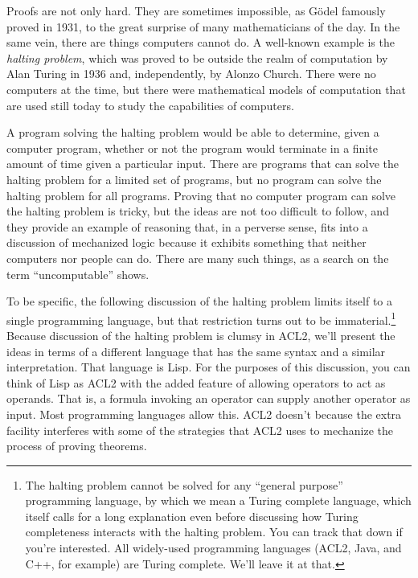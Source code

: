 Proofs are not only hard.
They are sometimes impossible, as G\"odel famously proved in 1931,
to the great surprise of many mathematicians of the day.
In the same vein, there are things computers cannot do.
A well-known example is the \emph{halting problem}, which
was proved to be outside the realm of computation
by Alan Turing in 1936
and, independently, by Alonzo Church.
There were no computers at the time,
but there were mathematical models of computation
that are used still today to study the capabilities of computers.

A program solving the
halting problem would be able to determine,
given a computer program, whether or not the program would terminate
in a finite amount of time given a particular input.
There are programs that can solve the halting problem for
a limited set of programs,
but no program can solve the halting problem for all programs.
Proving that no computer program can solve the halting problem is tricky,
but the ideas are not too difficult to follow, and
they provide an example of reasoning that,
in a perverse sense, fits into a discussion of mechanized logic
because it exhibits something that neither computers
nor people can do. There are many such things, as a search
on the term ``uncomputable'' shows.

To be specific, the following discussion of the halting problem
limits itself to a single programming language, but
that restriction turns out to be immaterial.\footnote{The
halting problem cannot be solved
for any ``general purpose'' programming language,
by which we mean a Turing complete language,
which itself calls for a long explanation even
before discussing how Turing completeness
interacts with the halting problem.
You can track that down if you're interested.
All widely-used programming languages
(ACL2, Java, and C++, for example) are Turing complete.
We'll leave it at that.}
Because discussion of the halting problem is clumsy in ACL2,
we'll present the ideas in terms of a different
language that has the same syntax
and a similar interpretation. That language is Lisp.
For the purposes of this discussion,
you can think of Lisp as ACL2 with the added feature
of allowing operators to act as operands.
That is, a formula invoking an operator can supply
another operator as input.
Most programming languages allow this.
ACL2 doesn't because the extra facility
interferes with some of the strategies that ACL2 uses
to mechanize the process of proving theorems.

